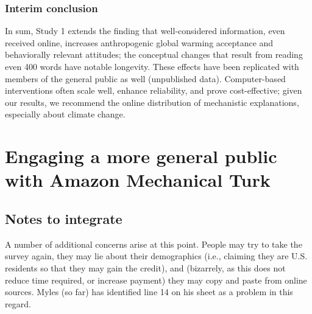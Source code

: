 \subsubsection{Interim conclusion}

In sum, Study 1 extends the finding that well-considered information, even
received online, increases anthropogenic global warming acceptance and
behaviorally relevant attitudes; the conceptual changes that result from reading
even 400 words have notable longevity. These effects have been replicated with
members of the general public as well (unpublished data). Computer-based
interventions often scale well, enhance reliability, and prove cost-effective;
given our results, we recommend the online distribution of mechanistic
explanations, especially about climate change.  



\section{Engaging a more general public with Amazon Mechanical Turk}

\subsection{Notes to integrate}

A number of additional concerns arise at this point. People may try to take the
survey again, they may lie about their demographics (i.e., claiming they are
U.S. residents so that they may gain the credit), and (bizarrely, as this does
not reduce time required, or increase payment) they may copy and paste from
online sources. Myles (so far) has identified line 14 on his sheet as a problem
in this regard.
